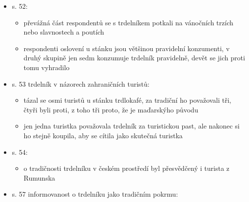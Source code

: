 \begin{itemize}
\begin{itemize}
\begin{itemize}
      \begin{itemize}
      \tightlist
      \item
        respondenti, kteří s tradičností nesouhlasili nejčastěji kladli
        jeho původ do maďarskýho prostředí, možná kvůli kampani Janka
        Rubeše
      \item
        někteří respondenti se domnívali, že trdelník se v Česku tradicí
        stává, nebo už stal
      \item
        převážná část respondentů měli trdelník poprvý v desátých
        letech, menší v nultejch a jen tři v minulym století -\/- šlo o
        starší generaci
      \end{itemize}
    \item
      s. 52:

      \begin{itemize}
      \tightlist
      \item
        převážná část respondentů se s trdelníkem potkali na vánočních
        trzích nebo slavnostech a poutích
      \item
        respondenti oslovení u stánku jsou většinou pravidelní
        konzumenti, v druhý skupině jen sedm konzumuje trdelník
        pravidelně, devět se jich proti tomu vyhradilo
      \end{itemize}
    \item
      s. 53 trdelník v názorech zahraničních turistů:

      \begin{itemize}
      \tightlist
      \item
        tázal se osmi turistů u stánku trdlokafé, za tradiční ho
        považovali tři, čtyři byli proti, z toho tři proto, že je
        maďarskýho původu
      \item
        jen jedna turistka považovala trdelník za turistickou past, ale
        nakonec si ho stejně koupila, aby se cítila jako skutečná
        turistka
      \end{itemize}
    \item
      s. 54:

      \begin{itemize}
      \tightlist
      \item
        o tradičnosti trdelníku v českém prostředí byl přesvědčený i
        turista z Rumunska
      \end{itemize}
    \item
      s. 57 informovanost o trdelníku jako tradičním pokrmu:


\end{itemize}
\end{itemize}
\end{itemize}
